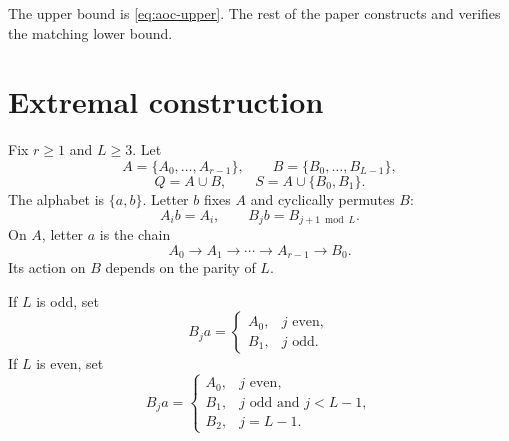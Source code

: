 \documentclass[11pt]{article}
\theoremstyle{definition}
\theoremstyle{remark}
\begin{document}
The upper bound is \eqref{eq:aoc-upper}. The rest of the paper constructs and verifies the matching lower bound.

\section{Extremal construction}
Fix $r\ge1$ and $L\ge3$. Let
\[
A=\{A_0,\ldots,A_{r-1}\},\qquad
B=\{B_0,\ldots,B_{L-1}\},
\]
\[
Q=A\cup B,\qquad S=A\cup\{B_0,B_1\}.
\]
The alphabet is $\{a,b\}$. Letter $b$ fixes $A$ and cyclically permutes $B$:
\[
A_i b=A_i,\qquad B_j b=B_{j+1\bmod L}.
\]
On $A$, letter $a$ is the chain
\[
A_0\to A_1\to\cdots\to A_{r-1}\to B_0.
\]
Its action on $B$ depends on the parity of $L$.

If $L$ is odd, set
\begin{equation}\label{eq:odd-a}
B_j a=\begin{cases}
A_0,&j\text{ even},\\
B_1,&j\text{ odd}.
\end{cases}
\end{equation}
If $L$ is even, set
\begin{equation}\label{eq:even-a}
B_j a=\begin{cases}
A_0,&j\text{ even},\\
B_1,&j\text{ odd and }j<L-1,\\
B_2,&j=L-1.
\end{cases}
\end{equation}
\end{document}
